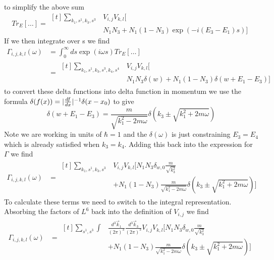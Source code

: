to simplify the above sum
\begin{equation}
  Tr_E[\dots] = \begin{aligned}[t]
    \sum_{k_1,s^1,k_3,s^3 }
     & V_{i,j} V_{k,l} [ \\
     & N_1 N_3
        + N_1 (1 - N_3) \exp{(-i(E_3 - E_1)s)}]
  \end{aligned}
\end{equation}
If we then integrate over s we find
\begin{align}
  \Gamma_{i,j, k,l}(\omega) & =
  \int_0^\infty{}{
    ds \exp{(i\omega{}s)} Tr_{E}[\dots]
  }                                                      \\
  {}                        & =\begin{aligned}[t]
    \sum_{k_1,s^1,k_3,s^3,k_4,s^4 }
     & V_{i,j} V_{k,l} [ \\
     & N_1 N_3 \delta(w)
        + N_1 (1 - N_3)  \delta(w + E_1 -E_3) ]
  \end{aligned}
\end{align}
to convert these delta functions
into delta function in momentum we
use the formula
\(\delta(f(x)) =
\lvert\frac{df}{dx}\rvert^{-1}\delta(x - x_0)\)
to give
\begin{equation}
  \delta(w + E_1 -E_3) =
  \frac{m}{\sqrt{k_1^2 - 2m\omega}}
  \delta({k_3 \pm \sqrt{k_1^2 + 2m\omega}})
\end{equation}
Note we are working in units of \(\hbar = 1\)
and the \(\delta(\omega)\) is just
constraining \(E_3 = E_4\) which is
already satisfied when \(k_3 = k_4\).
Adding this back into the expression
for \(\Gamma \) we find
\begin{align}
  \Gamma_{i,j, k,l}(\omega) & =\begin{aligned}[t]
    \sum_{k_1,s^1,k_3,s^3 }
     & V_{i,j} V_{k,l} [
    N_1 N_3 \delta_{w, 0} \frac{m}{\sqrt{k_3^2}} \\
     & + N_1 (1 - N_3)
        \frac{m}{\sqrt{k_1^2 - 2m\omega}}
        \delta({k_3 \pm \sqrt{k_1^2 + 2m\omega}}) ]
  \end{aligned}
\end{align}
To calculate these terms we
need to switch to the integral
representation. Absorbing the factors
of \(L^6\) back into the definition
of \(V_{i,j}\) we find
\begin{align}
  \Gamma_{i,j, k,l}(\omega) & =\begin{aligned}[t]
    \sum_{s^1,s^3} \int &
    \frac{d^3\vec{k}_1}{{(2\pi)}^3}
    \frac{d^3\vec{k}_3}{{(2\pi)}^3}
    V_{i,j} V_{k,l} [
    N_1 N_3 \delta_{w, 0} \frac{m}{\sqrt{k_3^2}} \\
                        & + N_1 (1 - N_3)
        \frac{m}{\sqrt{k_1^2 - 2m\omega}}
        \delta({k_3 \pm \sqrt{k_1^2 + 2m\omega}}) ]
  \end{aligned}
\end{align}
